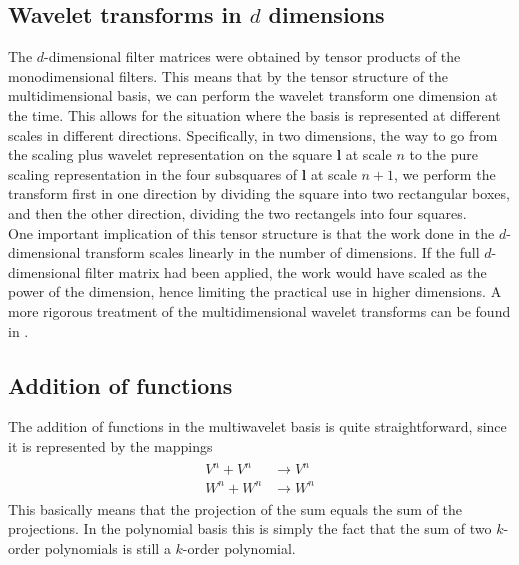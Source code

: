 \subsection*{Wavelet transforms in $d$ dimensions}
The $d$-dimensional filter matrices were obtained by tensor products of the
monodimensional filters. This means that by the tensor structure of
the multidimensional basis, we can perform the wavelet transform one dimension 
at the time. This allows for the situation where the basis is represented at
different scales in different directions. Specifically, in two dimensions, the 
way to go from the scaling plus wavelet representation on the square
$\boldsymbol{l}$ at scale $n$ to the pure scaling representation in the four
subsquares of $\boldsymbol{l}$ at scale $n+1$, we perform the transform first 
in one direction by dividing the square into two rectangular boxes, and then
the other direction, dividing the two rectangels into four squares.\\

\noindent
One important implication of this tensor structure is that the work done in
the $d$-dimensional transform scales linearly in the number of dimensions. If 
the full
$d$-dimensional filter matrix had been applied, the work would have scaled
as the power of the dimension, hence limiting the practical use in higher
dimensions. A more rigorous treatment of the multidimensional wavelet
transforms can be found in \cite{Tymczak}.

\subsection{Addition of functions}
The addition of functions in the multiwavelet basis is quite straightforward, 
since it is represented by the mappings
\begin{align}
	\label{eq:addmap}
	\begin{split}
	V^n + V^n &\rightarrow V^n\\
	W^n + W^n &\rightarrow W^n
	\end{split}
\end{align}
This basically means that the projection of the sum equals the sum of the
projections. In the polynomial basis this is simply the fact that the sum of
two $k$-order polynomials is still a $k$-order polynomial.\\

